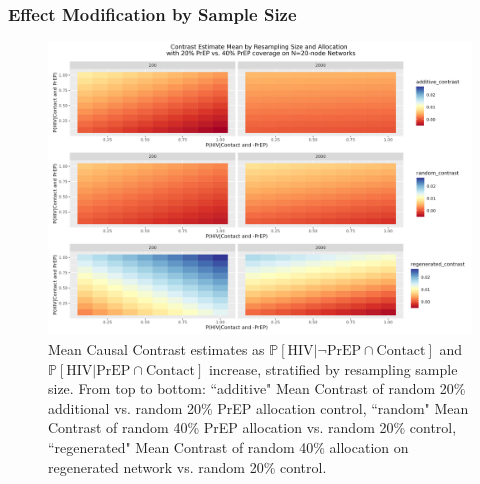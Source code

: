 \documentclass{article}
\theoremstyle{definition}
\begin{document}
\subsubsection{Effect Modification by Sample Size}
\begin{figure}[H]
    \centering
    \includegraphics[width=\linewidth]{Corrected Figures/Resampling Size Mean Plot.png}
    \caption{Mean Causal Contrast estimates as $\mathbb{P}\left[\text{HIV} \vert \neg \text{PrEP} \cap \text{Contact}\right]$ and $\mathbb{P}\left[\text{HIV} \vert \text{PrEP} \cap \text{Contact}\right]$ increase, stratified by resampling sample size. From top to bottom: ``additive" Mean Contrast of random 20\% additional vs. random 20\% PrEP allocation control, ``random" Mean Contrast of random 40\% PrEP allocation vs. random 20\% control, ``regenerated" Mean Contrast of random 40\% allocation on regenerated network vs. random 20\% control.}
    \label{fig:Figure S4.3}
\end{figure}
\end{document}

